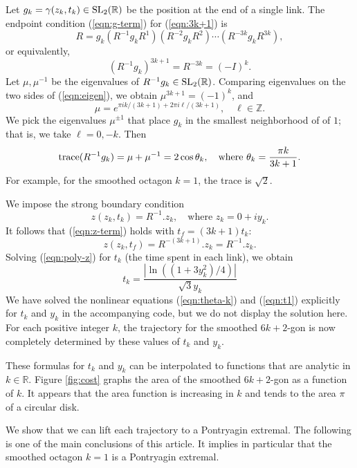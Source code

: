 \documentclass{article}
\theoremstyle{remark}
\newcommand{\ring}[1]{\mathbb{#1}}
\newcommand{\op}[1]{\hbox{#1}}
\def\SL{\op{SL}_2(\ring{R})}
\begin{document}
Let $g_k = \gamma(z_k,t_k)\in \SL$ be the position at the end of a
single link.  The endpoint condition (\ref{eqn:g-term}) for
(\ref{eqn:3k+1}) is
\[
R = g_k (R^{-1} g_k R^1) (R^{-2} g_k R^2) \cdots (R^{-3k} g_k R^{3k}),
\]
or equivalently,
\begin{equation}\label{eqn:eigen}
(R^{-1} g_k)^{3k+1} = R^{-3k} = (-I)^k.
\end{equation}
Let $\mu,\mu^{-1}$ be the eigenvalues of $R^{-1} g_k\in \SL$.
Comparing eigenvalues on the two sides of (\ref{eqn:eigen}), we obtain
$\mu^{3k+1} = (-1)^k$, and
\[
\mu = e^{\pi i k/(3k+1) + 2\pi i \ell/(3k+1)},\quad \ell \in\ring{Z}.
\]
We pick the eigenvalues $\mu^{\pm1}$ that place $g_k$ in the smallest
neighborhood of of $1$; that is, we take $\ell=0,-k$.  Then
\begin{equation}\label{eqn:theta-k}
\op{trace}(R^{-1} g_k) = \mu+\mu^{-1}=2\cos\theta_k,\quad 
\text{where } \theta_k= \frac{\pi k}{3k+1}.
\end{equation}
For example, for the smoothed octagon $k=1$, the trace is
$\sqrt{2}$.

We impose the strong boundary condition
\begin{equation}\label{eqn:poly-z}
z(z_k,t_k) = R^{-1}.z_k,\quad \text{where } z_k = 0 + i y_k.
\end{equation}
It follows that (\ref{eqn:z-term}) holds with $t_f = (3k+1) t_k$:
\[
z(z_k,t_f) = R^{-(3k+1)}.z_k = R^{-1}.z_k.
\]
Solving (\ref{eqn:poly-z}) for $t_k$ (the time spent in each link), we
obtain
\begin{equation}\label{eqn:t1}
t_k = \frac{|\ln ((1+ 3y_k^2)/4)|}{\sqrt{3} y_k} 
\end{equation}
We have solved the nonlinear equations (\ref{eqn:theta-k}) and
(\ref{eqn:t1}) explicitly for $t_k$ and $y_k$ in the accompanying
code, but we do not display the solution here.  For each positive
integer $k$, the trajectory for the smoothed $6k+2$-gon is now
completely determined by these values of $t_k$ and $y_k$.

These formulas for $t_k$ and $y_k$ can be interpolated to functions
that are analytic in $k\in \ring{R}$.  Figure \ref{fig:cost} graphs the area of the
smoothed $6k+2$-gon as a function of $k$.  It appears that the area
function is increasing in $k$ and tends to the area $\pi$ of a circular disk.

We show that we can lift each trajectory to a Pontryagin extremal.
The following is one of the main conclusions of this article.  It
implies in particular that the smoothed octagon $k=1$ is a Pontryagin
extremal.
\end{document}

